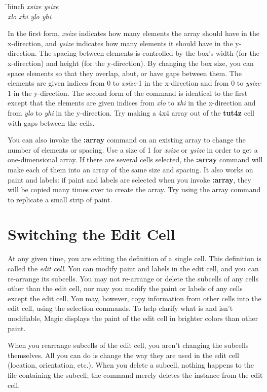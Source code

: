 \documentclass[letterpaper,twoside,12pt]{article}
\def\hinch{\hspace*{0.5in}}
\def\starti{\begin{center}\begin{tabbing}\hinch\=\hinch\=\hinch\=hinch\hinch\=\kill}
\def\endi{\end{tabbing}\end{center}}
\def\ii{\>\>\>}
\begin{document}
\starti
   \ii {\bfseries :array} {\itshape xsize ysize} \\
   \ii {\bfseries :array} {\itshape xlo xhi ylo yhi}
\endi

In the first form, {\itshape xsize} indicates how many elements
the array should have in the x-direction, and {\itshape ysize}
indicates how many elements it should have in the y-direction.
The spacing between elements is controlled by the box's
width (for the x-direction) and height (for the y-direction).
By changing the box size, you can space elements so that they
overlap, abut, or have gaps between them.
The elements are given indices from 0 to {\itshape xsize}-1 in
the x-direction and from 0 to {\itshape ysize}-1 in the
y-direction.  The second form of the command is identical
to the first except that the elements are given indices
from {\itshape xlo} to {\itshape xhi} in the x-direction and from
{\itshape ylo} to {\itshape yhi} in the y-direction.  Try making
a 4x4 array out of the {\bfseries tut4z} cell with gaps between
the cells.

You can also invoke the {\bfseries :array} command on an
existing array to change the number of elements or
spacing.  Use a size of 1 for {\itshape xsize} or {\itshape ysize}
in order to get a one-dimensional array.  If there are
several cells selected, the {\bfseries :array} command will make
each of them into an array of the same size and spacing.
It also works on paint and labels:  if paint and labels
are selected when you invoke {\bfseries :array}, they will be
copied many times over to create the array.  Try using the array
command to replicate a small strip of paint.

\section{Switching the Edit Cell}

At any given time, you are editing the definition of a single
cell.  This definition is called the {\itshape edit cell}.  You
can modify paint and labels in the edit cell, and you can
re-arrange its subcells.  You may not re-arrange or delete
the subcells of any cells other than the edit cell, nor may
you modify the paint or labels of any cells except the edit
cell.  You may, however, copy information from other cells into
the edit cell, using the selection commands.
To help clarify what is and isn't modifiable, Magic
displays the paint of the edit cell in brighter colors than
other paint.

When you rearrange subcells of the edit cell, you aren't changing the
subcells themselves.  All you can do is change the way they are
used in the edit cell (location, orientation, etc.).  When you
delete a subcell, nothing happens to the file containing the
subcell;  the command merely deletes the instance from the edit cell.
\end{document}
